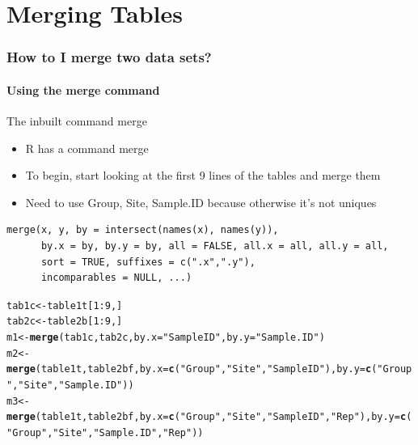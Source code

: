 \documentclass[10pt,handout,english]{beamer}\usepackage[]{graphicx}\usepackage[]{color}
\makeatletter
\newcommand{\hlnum}[1]{\textcolor[rgb]{0.686,0.059,0.569}{#1}}%
\newcommand{\hlstr}[1]{\textcolor[rgb]{0.192,0.494,0.8}{#1}}%
\newcommand{\hlopt}[1]{\textcolor[rgb]{0,0,0}{#1}}%
\newcommand{\hlstd}[1]{\textcolor[rgb]{0.345,0.345,0.345}{#1}}%
\newcommand{\hlkwb}[1]{\textcolor[rgb]{0.69,0.353,0.396}{#1}}%
\newcommand{\hlkwc}[1]{\textcolor[rgb]{0.333,0.667,0.333}{#1}}%
\newcommand{\hlkwd}[1]{\textcolor[rgb]{0.737,0.353,0.396}{\textbf{#1}}}%
\newenvironment{kframe}{%
 \def\at@end@of@kframe{}%
 \ifinner\ifhmode%
  \def\at@end@of@kframe{\end{minipage}}%
  \begin{minipage}{\columnwidth}%
 \fi\fi%
 \def\FrameCommand##1{\hskip\@totalleftmargin \hskip-\fboxsep
 \colorbox{shadecolor}{##1}\hskip-\fboxsep
     \hskip-\linewidth \hskip-\@totalleftmargin \hskip\columnwidth}%
 \MakeFramed {\advance\hsize-\width
   \@totalleftmargin\z@ \linewidth\hsize
   \@setminipage}}%
 {\par\unskip\endMakeFramed%
 \at@end@of@kframe}
\newenvironment{knitrout}{}{} %
\makeatother
\begin{document}
\section*{Merging Tables}
\begin{frame}[fragile]
  \frametitle{How to I merge two data sets?}
  \framesubtitle{Using the merge command}

\begin{block}{The inbuilt command merge}
\begin{itemize}
\item R has a command merge
\item To begin, start looking at the first 9 lines of the tables and merge them 
\item Need to use Group, Site, Sample.ID because otherwise it's not uniques
\end{itemize}
\end{block}
\begin{lstlisting}
merge(x, y, by = intersect(names(x), names(y)),
      by.x = by, by.y = by, all = FALSE, all.x = all, all.y = all,
      sort = TRUE, suffixes = c(".x",".y"),
      incomparables = NULL, ...)
\end{lstlisting}

\begin{knitrout}
\color{fgcolor}\begin{kframe}
\begin{alltt}
\hlstd{tab1c}\hlkwb{<-}\hlstd{table1t[}\hlnum{1}\hlopt{:}\hlnum{9}\hlstd{,]}
\hlstd{tab2c}\hlkwb{<-}\hlstd{table2b[}\hlnum{1}\hlopt{:}\hlnum{9}\hlstd{,]}
\hlstd{m1}\hlkwb{<-}\hlkwd{merge}\hlstd{(tab1c,tab2c,}\hlkwc{by.x}\hlstd{=}\hlstr{"Sample ID"}\hlstd{,}\hlkwc{by.y}\hlstd{=}\hlstr{"Sample.ID"}\hlstd{)}
\hlstd{m2}\hlkwb{<-}\hlkwd{merge}\hlstd{(table1t,table2bf,}\hlkwc{by.x}\hlstd{=}\hlkwd{c}\hlstd{(}\hlstr{"Group"}\hlstd{,}\hlstr{"Site"}\hlstd{,}\hlstr{"Sample ID"}\hlstd{),}\hlkwc{by.y}\hlstd{=}\hlkwd{c}\hlstd{(}\hlstr{"Group"}\hlstd{,}\hlstr{"Site"}\hlstd{,}\hlstr{"Sample.ID"}\hlstd{))}
\hlstd{m3}\hlkwb{<-}\hlkwd{merge}\hlstd{(table1t,table2bf,}\hlkwc{by.x}\hlstd{=}\hlkwd{c}\hlstd{(}\hlstr{"Group"}\hlstd{,}\hlstr{"Site"}\hlstd{,}\hlstr{"Sample ID"}\hlstd{,}\hlstr{"Rep"}\hlstd{),}\hlkwc{by.y}\hlstd{=}\hlkwd{c}\hlstd{(}\hlstr{"Group"}\hlstd{,}\hlstr{"Site"}\hlstd{,}\hlstr{"Sample.ID"}\hlstd{,}\hlstr{"Rep"}\hlstd{))}
\end{alltt}
\end{kframe}
\end{knitrout}
\end{frame}  
\end{document}
